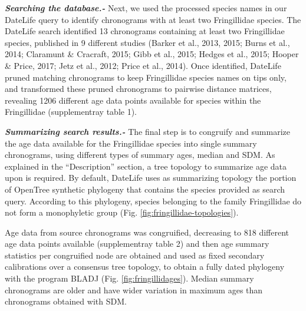 \documentclass[
  man]{apa6}
\begin{document}
\vspace{5mm}

\emph{\textbf{Searching the database.-}}
Next, we used the processed species names in our DateLife query to identify chronograms with at least two Fringillidae species.
The DateLife search identified 13 chronograms containing at least two Fringillidae species, published in 9 different studies (Barker et al., 2013, 2015; Burns et al., 2014; Claramunt \& Cracraft, 2015; Gibb et al., 2015; Hedges et al., 2015; Hooper \& Price, 2017; Jetz et al., 2012; Price et al., 2014).
Once identified, DateLife pruned matching chronograms to keep Fringillidae species names on tips only, and transformed these pruned chronograms to pairwise distance matrices, revealing 1206 different age data points available for species within the Fringillidae (supplementray table 1).

\vspace{5mm}

\emph{\textbf{Summarizing search results.-}}
The final step is to congruify and summarize the age data available for the Fringillidae species into single summary chronograms, using different types of summary ages, median and SDM.
As explained in the ``Description'' section, a tree topology to summarize age data upon is required.
By default, DateLife uses as summarizing topology the portion of OpenTree synthetic phylogeny that contains the species provided as search query.
According to this phylogeny, species belonging to the family Fringillidae do not form a monophyletic group (Fig. \ref{fig:fringillidae-topologies}).

Age data from source chronograms was congruified, decreasing to 818 different age data points available (supplementray table 2) and then age summary statistics per congruified node are obtained and used as fixed secondary calibrations over a consensus tree topology, to obtain a fully dated phylogeny with the program BLADJ (Fig. \ref{fig:fringillidages}).
Median summary chronograms are older and have wider variation in maximum ages than chronograms obtained with SDM.

\vspace{20mm}
\end{document}

